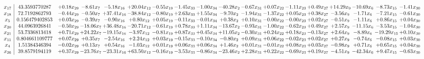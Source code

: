 \documentclass[9pt]{article}
\begin{document}
 \[\begin{array}{c| c c@{\hskip 2pt} c@{\hskip 2pt} c@{\hskip 2pt} c@{\hskip 2pt} c@{\hskip 2pt} c@{\hskip 2pt} c@{\hskip 2pt} c@{\hskip 2pt} c@{\hskip 2pt} c@{\hskip 2pt} c@{\hskip 2pt} c@{\hskip 2pt} c@{\hskip 2pt} c@{\hskip 2pt} c@{\hskip 2pt} c@{\hskip 2pt} }
 x_{17}   &  43.3593770287 & +  0.18 x_{29} & -8.61 x_{7} & -5.18 x_{16} & + 20.04 x_{12} & -0.55 x_{19} & -1.45 x_{33} & -1.00 x_{34} & -40.28 x_{2} & -0.67 x_{31} & +  0.07 x_{22} & -1.11 x_{23} & +  0.49 x_{27} & + 14.29 x_{9} & -10.69 x_{6} & -8.73 x_{15} & -1.41 x_{30}\\
 x_{18}   &  72.7192862793 & -0.44 x_{29} & -0.50 x_{7} & + 37.41 x_{16} & -38.84 x_{12} & -0.80 x_{19} & +  2.63 x_{33} & +  1.55 x_{34} & -9.70 x_{2} & -1.94 x_{31} & -1.37 x_{22} & +  0.05 x_{23} & +  0.38 x_{27} & -3.56 x_{9} & -1.71 x_{6} & -7.21 x_{15} & -0.61 x_{30}\\
 x_{5}   &  0.156479402853 & +  0.03 x_{29} & -0.39 x_{7} & -0.90 x_{16} & +  0.80 x_{12} & +  0.05 x_{19} & -0.11 x_{33} & -0.01 x_{34} & +  0.38 x_{2} & +  0.10 x_{31} & -0.00 x_{22} & -0.00 x_{23} & +  0.02 x_{27} & -0.51 x_{9} & -1.11 x_{6} & +  0.86 x_{15} & +  0.04 x_{30}\\
 x_{20}   &  44.0963926841 & -0.50 x_{29} & -18.06 x_{7} & + 36.48 x_{16} & -20.71 x_{12} & -0.61 x_{19} & +  0.78 x_{33} & +  1.11 x_{34} & -13.67 x_{2} & -0.93 x_{31} & -1.00 x_{22} & -0.62 x_{23} & +  0.49 x_{27} & +  2.57 x_{9} & -11.15 x_{6} & -3.53 x_{15} & -1.04 x_{30}\\
 x_{21}   &  53.7336813418 & +  0.71 x_{29} & + 24.22 x_{7} & -19.15 x_{16} & -3.97 x_{12} & -0.81 x_{19} & +  0.87 x_{33} & +  0.45 x_{34} & + 11.05 x_{2} & -0.30 x_{31} & +  0.24 x_{22} & +  0.18 x_{23} & -0.13 x_{27} & +  2.64 x_{9} & -8.89 x_{6} & -19.29 x_{15} & +  0.10 x_{30}\\
 x_{11}   &  0.804661109777 & +  0.07 x_{29} & +  0.35 x_{7} & -2.54 x_{16} & +  2.24 x_{12} & +  0.03 x_{19} & -0.15 x_{33} & -0.10 x_{34} & -0.80 x_{2} & +  0.09 x_{31} & +  0.06 x_{22} & -0.02 x_{23} & +  0.02 x_{27} & +  0.27 x_{9} & -0.74 x_{6} & -0.08 x_{15} & +  0.03 x_{30}\\
 x_{4}   &  1.51384346394 & -0.02 x_{29} & +  0.13 x_{7} & +  0.54 x_{16} & -1.03 x_{12} & +  0.01 x_{19} & +  0.06 x_{33} & +  0.06 x_{34} & +  1.46 x_{2} & +  0.01 x_{31} & -0.01 x_{22} & +  0.08 x_{23} & +  0.03 x_{27} & -0.98 x_{9} & +  0.71 x_{6} & +  0.65 x_{15} & +  0.04 x_{30}\\
 x_{26}   &  39.8579194119 & +  0.37 x_{29} & -23.76 x_{7} & -23.31 x_{16} & + 63.50 x_{12} & -0.16 x_{19} & -3.53 x_{33} & -0.86 x_{34} & -23.46 x_{2} & +  2.28 x_{31} & +  0.22 x_{22} & -0.69 x_{23} & +  0.19 x_{27} & -4.51 x_{9} & -42.34 x_{6} & +  9.47 x_{15} & -0.63 x_{30}\\

\end{array}\]
\end{document}
